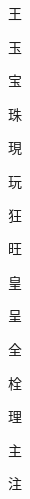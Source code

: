 \begin{spacing}{2.5}
{\Huge \begin{CJK}{UTF8}{min} 王\end{CJK}}\hspace{0.1cm}
{\Huge \begin{CJK}{UTF8}{min} 玉\end{CJK}}\hspace{0.1cm}
{\Huge \begin{CJK}{UTF8}{min} 宝\end{CJK}}\hspace{0.1cm}
{\Huge \begin{CJK}{UTF8}{min} 珠\end{CJK}}\hspace{0.1cm}
{\Huge \begin{CJK}{UTF8}{min} 現\end{CJK}}\hspace{0.1cm}
{\Huge \begin{CJK}{UTF8}{min} 玩\end{CJK}}\hspace{0.1cm}
{\Huge \begin{CJK}{UTF8}{min} 狂\end{CJK}}\hspace{0.1cm}
{\Huge \begin{CJK}{UTF8}{min} 旺\end{CJK}}\hspace{0.1cm}
{\Huge \begin{CJK}{UTF8}{min} 皇\end{CJK}}\hspace{0.1cm}
{\Huge \begin{CJK}{UTF8}{min} 呈\end{CJK}}\hspace{0.1cm}
{\Huge \begin{CJK}{UTF8}{min} 全\end{CJK}}\hspace{0.1cm}
{\Huge \begin{CJK}{UTF8}{min} 栓\end{CJK}}\hspace{0.1cm}
{\Huge \begin{CJK}{UTF8}{min} 理\end{CJK}}\hspace{0.1cm}
{\Huge \begin{CJK}{UTF8}{min} 主\end{CJK}}\hspace{0.1cm}
{\Huge \begin{CJK}{UTF8}{min} 注\end{CJK}}\hspace{0.1cm}

\end{spacing}
